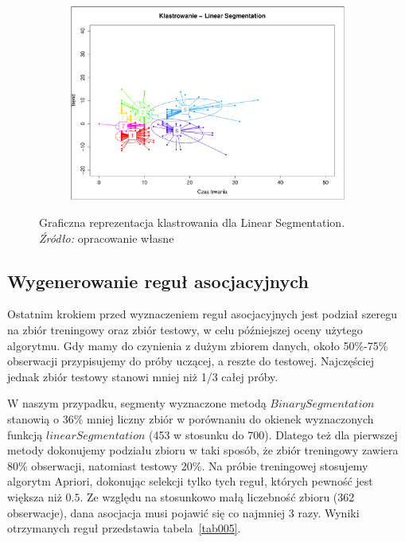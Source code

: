 \documentclass[polish, twoside, 12pt, a4paper]{article}
\theoremstyle{definition}
\theoremstyle{plain}
\theoremstyle{remark}
\begin{document}
\begin{figure}[H]
  \centering

  \begin{subfigure}[t]{1.00\textwidth}
    \includegraphics[width=\textwidth]{./rys013}
  \end{subfigure}

  \captionsetup{margin=10pt,font=small,labelfont=bf,width=.8\textwidth}

  \caption[Graficzna reprezentacja klastrowania dla Linear Segmentation]{Graficzna reprezentacja klastrowania dla Linear Segmentation. \textit{Źródło:} opracowanie własne}\label{rys013}
\end{figure}

\subsection{Wygenerowanie reguł asocjacyjnych}

Ostatnim krokiem przed wyznaczeniem reguł asocjacyjnych jest podział szeregu na zbiór treningowy oraz zbiór testowy, w celu późniejszej oceny użytego algorytmu. Gdy mamy 
do czynienia z dużym zbiorem danych, około 50\%-75\% obserwacji przypisujemy do próby uczącej, a reszte do testowej. Najczęściej jednak zbiór testowy stanowi mniej niż 1/3 całej próby.

W naszym przypadku, segmenty wyznaczone metodą \(Binary Segmentation\) stanowią o 36\% mniej liczny zbiór w porównaniu do okienek wyznaczonych funkcją \(linearSegmentation\)
(453 w stosunku do 700). Dlatego też dla pierwszej metody dokonujemy podziału zbioru w taki sposób, że zbiór treningowy zawiera 80\% obserwacji, natomiast testowy 20\%. Na próbie 
treningowej stosujemy algorytm Apriori, dokonując selekcji tylko tych reguł, których pewność jest większa niż \(0.5\). Ze względu na stosunkowo małą liczebność zbioru (362 obserwacje), 
dana asocjacja musi pojawić się co najmniej 3 razy. Wyniki otrzymanych reguł przedstawia tabela~\ref{tab005}.
\end{document}

